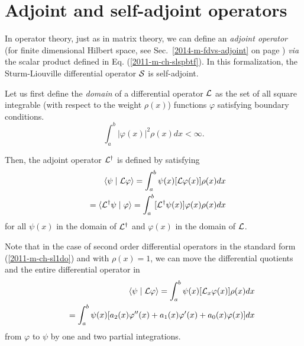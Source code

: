 \section{Adjoint and self-adjoint operators}

In operator theory,
just as in matrix theory,
we can define an
{\em adjoint operator}
(for finite dimensional Hilbert space, see Sec.~\ref{2014-m-fdvs-adjoint} on page \pageref{2014-m-fdvs-adjoint})
{\it via} the scalar product
defined in Eq. (\ref{2011-m-ch-slspbtf}).
In this formalization,
the Sturm-Liouville differential operator ${\cal S}$
is self-adjoint.

Let us first define the
{\em domain}  of a differential operator ${\cal L}$ as the set of all  square integrable
(with respect to the weight  $\rho  (x)$)
functions $\varphi$ satisfying boundary conditions.
\begin{equation}
\int_a^b \vert \varphi (x) \vert^2 \rho  (x) dx < \infty
.
\end{equation}


Then, the adjoint operator  ${\cal L}^\dagger$ is defined by  satisfying
\begin{equation}
\begin{split}
\langle \psi \mid {\cal L} \varphi \rangle
=
\int_a^b
\psi (x) [{\cal L}\varphi (x)]
\rho  (x)         dx
\\
\quad =\langle {\cal L}^\dagger \psi \mid \varphi \rangle
=
\int_a^b
[{\cal L}^\dagger \psi (x)] \varphi (x)
\rho  (x)         dx
\end{split}
\label{2011-m-ch-slspbtfao}
\end{equation}
for all $\psi (x)$ in the domain of ${\cal L}^\dagger$ and $\varphi (x)$ in the domain of ${\cal L}$.

Note that  in the case of second order differential operators
in the standard form (\ref{2011-m-ch-sl1do})  and with $\rho  (x) = 1$,
we can move the differential quotients and the entire differential operator in
\begin{equation}
\begin{split}
\langle \psi \mid {\cal L} \varphi \rangle
=
\int_a^b
\psi (x) [{\cal L}_x\varphi (x)]
\rho  (x)         dx   \\
\qquad =
\int_a^b
\psi (x)
[a_2(x) \varphi''(x) + a_1(x) \varphi'(x) + a_0(x) \varphi (x)]
dx
\end{split}
\label{2011-m-ch-slspbtfao1a}
\end{equation}
from
$\varphi$ to $\psi$
by one and two partial integrations.

